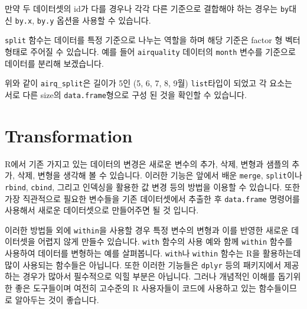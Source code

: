 \documentclass[
]{book}
\newenvironment{Shaded}{\begin{snugshade}}{\end{snugshade}}
\newcommand{\FunctionTok}[1]{\textcolor[rgb]{0.00,0.00,0.00}{#1}}
\newcommand{\NormalTok}[1]{#1}
\newcommand{\OtherTok}[1]{\textcolor[rgb]{0.56,0.35,0.01}{#1}}
\newcommand{\SpecialCharTok}[1]{\textcolor[rgb]{0.00,0.00,0.00}{#1}}
\begin{document}
만약 두 데이터셋의 id가 다를 경우나 각각 다른 기준으로 결합해야 하는 경우는 \texttt{by}대신 \texttt{by.x}, \texttt{by.y} 옵션을 사용할 수 있습니다.

\texttt{split} 함수는 데이터를 특정 기준으로 나누는 역할을 하며 해당 기준은 factor 형 벡터 형태로 주어질 수 있습니다. 예를 들어 \texttt{airquality} 데이터의 \texttt{month} 변수를 기준으로 데이터를 분리해 보겠습니다.

\begin{Shaded}
\end{Shaded}

위와 같이 \texttt{airq\_split}은 길이가 5인 (5, 6, 7, 8, 9월) \texttt{list}타입이 되었고 각 요소는 서로 다른 size의 \texttt{data.frame}형으로 구성 된 것을 확인할 수 있습니다.

\hypertarget{transformation}{%
\section{Transformation}\label{transformation}}

R에서 기존 가지고 있는 데이터의 변경은 새로운 변수의 추가, 삭제, 변형과 샘플의 추가, 삭제, 변형을 생각해 볼 수 있습니다. 이러한 기능은 앞에서 배운 \texttt{merge}, \texttt{split}이나 \texttt{rbind}, \texttt{cbind}, 그리고 인덱싱을 활용한 값 변경 등의 방법을 이용할 수 있습니다. 또한 가장 직관적으로 필요한 변수들을 기존 데이터셋에서 추출한 후 \texttt{data.frame} 명령어를 사용해서 새로운 데이터셋으로 만들어주면 될 것 입니다.

이러한 방법들 외에 \texttt{within}을 사용할 경우 특정 변수의 변형과 이를 반영한 새로운 데이터셋을 어렵지 않게 만들수 있습니다. \texttt{with} 함수의 사용 예와 함께 \texttt{within} 함수를 사용하여 데이터를 변형하는 예를 살펴봅니다. \texttt{with}나 \texttt{within} 함수는 R을 활용하는데 많이 사용되는 함수들은 아닙니다. 또한 이러한 기능들은 \texttt{dplyr} 등의 패키지에서 제공하는 경우가 많아서 필수적으로 익힐 부분은 아닙니다. 그러나 개념적인 이해를 돕기위한 좋은 도구들이며 여전히 고수준의 R 사용자들이 코드에 사용하고 있는 함수들이므로 알아두는 것이 좋습니다.
\end{document}
